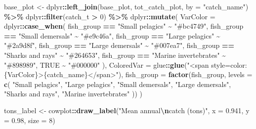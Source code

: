 \documentclass[
]{book}
\newenvironment{Shaded}{\begin{snugshade}}{\end{snugshade}}
\newcommand{\AttributeTok}[1]{\textcolor[rgb]{0.13,0.29,0.53}{#1}}
\newcommand{\ConstantTok}[1]{\textcolor[rgb]{0.56,0.35,0.01}{#1}}
\newcommand{\DecValTok}[1]{\textcolor[rgb]{0.00,0.00,0.81}{#1}}
\newcommand{\FloatTok}[1]{\textcolor[rgb]{0.00,0.00,0.81}{#1}}
\newcommand{\FunctionTok}[1]{\textcolor[rgb]{0.13,0.29,0.53}{\textbf{#1}}}
\newcommand{\NormalTok}[1]{#1}
\newcommand{\OtherTok}[1]{\textcolor[rgb]{0.56,0.35,0.01}{#1}}
\newcommand{\SpecialCharTok}[1]{\textcolor[rgb]{0.81,0.36,0.00}{\textbf{#1}}}
\newcommand{\StringTok}[1]{\textcolor[rgb]{0.31,0.60,0.02}{#1}}
\begin{document}
\begin{Shaded}
\begin{Highlighting}[]
\NormalTok{base\_plot }\OtherTok{\textless{}{-}}
\NormalTok{  dplyr}\SpecialCharTok{::}\FunctionTok{left\_join}\NormalTok{(base\_plot, tot\_catch\_plot, }\AttributeTok{by =} \StringTok{"catch\_name"}\NormalTok{) }\SpecialCharTok{\%\textgreater{}\%}
\NormalTok{  dplyr}\SpecialCharTok{::}\FunctionTok{filter}\NormalTok{(catch\_t }\SpecialCharTok{\textgreater{}} \DecValTok{0}\NormalTok{) }\SpecialCharTok{\%\textgreater{}\%}
\NormalTok{  dplyr}\SpecialCharTok{::}\FunctionTok{mutate}\NormalTok{(}
    \AttributeTok{VarColor =}\NormalTok{ dplyr}\SpecialCharTok{::}\FunctionTok{case\_when}\NormalTok{(}
\NormalTok{      fish\_group }\SpecialCharTok{==} \StringTok{"Small pelagics"} \SpecialCharTok{\textasciitilde{}} \StringTok{"\#bc4749"}\NormalTok{,}
\NormalTok{      fish\_group }\SpecialCharTok{==} \StringTok{"Small demersals"} \SpecialCharTok{\textasciitilde{}} \StringTok{"\#e9c46a"}\NormalTok{,}
\NormalTok{      fish\_group }\SpecialCharTok{==} \StringTok{"Large pelagics"} \SpecialCharTok{\textasciitilde{}} \StringTok{"\#2a9d8f"}\NormalTok{,}
\NormalTok{      fish\_group }\SpecialCharTok{==} \StringTok{"Large demersals"} \SpecialCharTok{\textasciitilde{}} \StringTok{"\#007ea7"}\NormalTok{,}
\NormalTok{      fish\_group }\SpecialCharTok{==} \StringTok{"Sharks and rays"} \SpecialCharTok{\textasciitilde{}} \StringTok{"\#264653"}\NormalTok{,}
\NormalTok{      fish\_group }\SpecialCharTok{==} \StringTok{"Marine invertebrates"} \SpecialCharTok{\textasciitilde{}} \StringTok{"\#898989"}\NormalTok{,}
      \ConstantTok{TRUE} \SpecialCharTok{\textasciitilde{}} \StringTok{"\#000000"}
\NormalTok{    ),}
    \AttributeTok{ColoredVar =}\NormalTok{ glue}\SpecialCharTok{::}\FunctionTok{glue}\NormalTok{(}\StringTok{"\textless{}span style=\textquotesingle{}color:\{VarColor\}\textquotesingle{}\textgreater{}\{catch\_name\}\textless{}/span\textgreater{}"}\NormalTok{),}
    \AttributeTok{fish\_group =} \FunctionTok{factor}\NormalTok{(fish\_group, }\AttributeTok{levels =} \FunctionTok{c}\NormalTok{(}
      \StringTok{"Small pelagics"}\NormalTok{, }\StringTok{"Large pelagics"}\NormalTok{, }\StringTok{"Small demersals"}\NormalTok{, }\StringTok{"Large demersals"}\NormalTok{,}
      \StringTok{"Sharks and rays"}\NormalTok{, }\StringTok{"Marine invertebrates"}
\NormalTok{    ))}
\NormalTok{  )}

\NormalTok{tons\_label }\OtherTok{\textless{}{-}}\NormalTok{ cowplot}\SpecialCharTok{::}\FunctionTok{draw\_label}\NormalTok{(}\StringTok{"Mean annual}\SpecialCharTok{\textbackslash{}n}\StringTok{catch (tons)"}\NormalTok{, }\AttributeTok{x =} \FloatTok{0.941}\NormalTok{, }\AttributeTok{y =} \FloatTok{0.98}\NormalTok{, }\AttributeTok{size =} \DecValTok{8}\NormalTok{)}


\end{Highlighting}
\end{Shaded}
\end{document}
